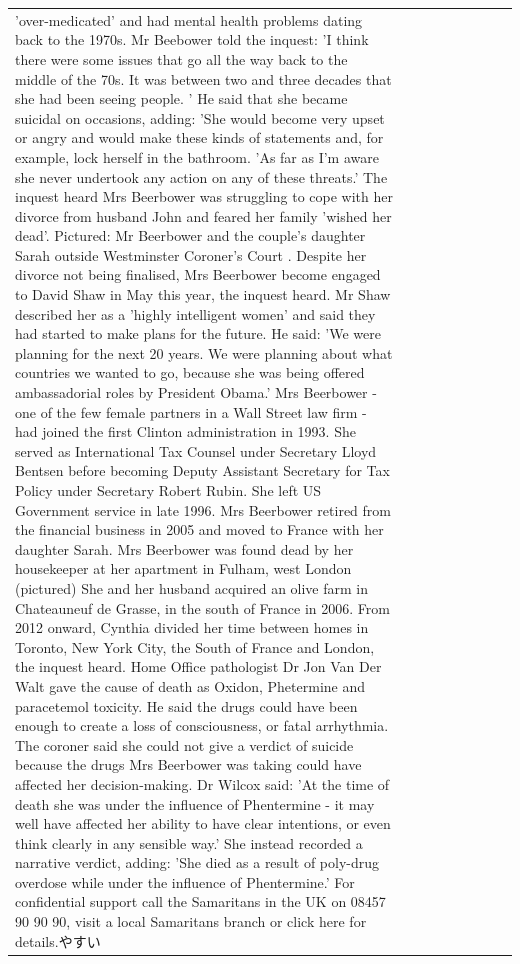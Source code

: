 \begin{table}[H]
\begin{tabular}{lllrlllll}
'over-medicated' and had mental health problems dating back to the 1970s. Mr Beebower told the inquest: 'I think there were some issues that go all the way back to the middle of the 70s. It was between two and three decades that she had been seeing people. ' He said that she became suicidal on occasions, adding: 'She would become very upset or angry and would make these kinds of statements and, for example, lock herself in the bathroom. 'As far as I'm aware she never undertook any action on any of these threats.' The inquest heard Mrs Beerbower was struggling to cope with her divorce from husband John and feared her family 'wished her dead'. Pictured: Mr Beerbower and the couple's daughter Sarah outside Westminster Coroner's Court . Despite her divorce not being finalised, Mrs Beerbower become engaged to David Shaw in May this year, the inquest heard. Mr Shaw described her as a 'highly intelligent women' and said they had started to make plans for the future. He said: 'We were planning for the next 20 years. We were planning about what countries we wanted to go, because she was being offered ambassadorial roles by President Obama.' Mrs Beerbower - one of the few female partners in a Wall Street law firm - had joined the first Clinton administration in 1993. She served as International Tax Counsel under Secretary Lloyd Bentsen before becoming Deputy Assistant Secretary for Tax Policy under Secretary Robert Rubin. She left US Government service in late 1996. Mrs Beerbower retired from the financial business in 2005 and moved to France with her daughter Sarah. Mrs Beerbower was found dead by her housekeeper at her apartment in Fulham, west London (pictured) She and her husband acquired an olive farm in Chateauneuf de Grasse, in the south of France in 2006. From 2012 onward, Cynthia divided her time between homes in Toronto, New York City, the South of France and London, the inquest heard. Home Office pathologist Dr Jon Van Der Walt gave the cause of death as Oxidon, Phetermine and paracetemol toxicity. He said the drugs could have been enough to create a loss of consciousness, or fatal arrhythmia. The coroner said she could not give a verdict of suicide because the drugs Mrs Beerbower was taking could have affected her decision-making. Dr Wilcox said: 'At the time of death she was under the influence of Phentermine - it may well have affected her ability to have clear intentions, or even think clearly in any sensible way.' She instead recorded a narrative verdict, adding: 'She died as a result of poly-drug overdose while under the influence of Phentermine.' For confidential support call the Samaritans in the UK on 08457 90 90 90, visit a local Samaritans branch or click here for details.やすい \\

\end{tabular}
\end{table}
